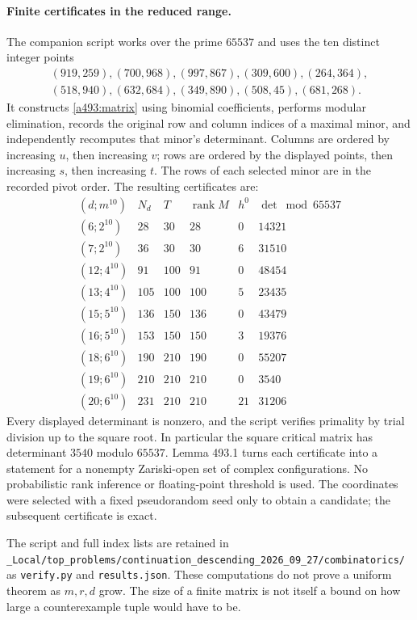 \documentclass[11pt]{article}
\begin{document}
\paragraph{Finite certificates in the reduced range.}
The companion script works over the prime $65537$ and uses the ten distinct
integer points
\[
\begin{gathered}
 (919,259),(700,968),(997,867),(309,600),(264,364),\\
 (518,940),(632,684),(349,890),(508,45),(681,268).
\end{gathered}
\]
It constructs \eqref{a493:matrix} using binomial coefficients, performs
modular elimination, records the original row and column indices of a
maximal minor, and independently recomputes that minor's determinant.
Columns are ordered by increasing $u$, then increasing $v$; rows are
ordered by the displayed points, then increasing $s$, then increasing
$t$. The rows of each selected minor are in the recorded pivot order.
The resulting certificates are:
\[
\begin{array}{c|r|r|r|r|r}
 (d;m^{10})&N_d&T&\operatorname{rank}M&h^0&\det\bmod65537\\\hline
 (6;2^{10})&28&30&28&0&14321\\
 (7;2^{10})&36&30&30&6&31510\\
 (12;4^{10})&91&100&91&0&48454\\
 (13;4^{10})&105&100&100&5&23435\\
 (15;5^{10})&136&150&136&0&43479\\
 (16;5^{10})&153&150&150&3&19376\\
 (18;6^{10})&190&210&190&0&55207\\
 (19;6^{10})&210&210&210&0&3540\\
 (20;6^{10})&231&210&210&21&31206
\end{array}
\]
Every displayed determinant is nonzero, and the script verifies primality
by trial division up to the square root. In particular the square critical
matrix has determinant $3540$ modulo $65537$. Lemma 493.1 turns each
certificate into a statement for a nonempty Zariski-open set of complex
configurations. No probabilistic rank inference or floating-point threshold
is used. The coordinates were selected with a fixed pseudorandom seed only
to obtain a candidate; the subsequent certificate is exact.

The script and full index lists are retained in
\nolinkurl{_Local/top_problems/continuation_descending_2026_09_27/combinatorics/}
as \texttt{verify.py} and \texttt{results.json}. These computations do not
prove a uniform theorem as $m,r,d$ grow. The size of a finite matrix is not
itself a bound on how large a counterexample tuple would have to be.
\end{document}
